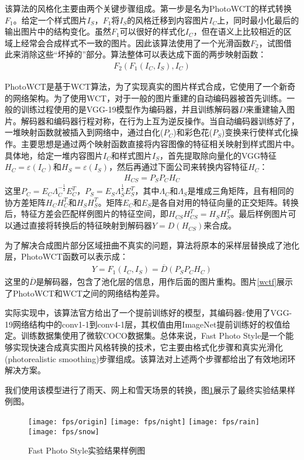 该算法的风格化主要由两个关键步骤组成。第一步是名为PhotoWCT的样式转换$F_1$。给定一个样式图片$I_S$，$F_1$将$I_S$的风格迁移到内容图片$I_C$上，同时最小化最后的输出图片中的结构变化。虽然$F_1$可以很好的样式化$I_C$，但在语义上比较相近的区域上经常会合成样式不一致的图片。因此该算法使用了一个光滑函数$F_2$，试图借此来消除这些“坏掉的”部分。算法整体可以表达成下面的两步映射函数：
\begin{align}
    F_2(F_1(I_C,I_S),I_C)
\end{align}

PhotoWCT是基于WCT\cite{wctp}算法，为了实现真实的图片样式合成，它使用了一个新奇的网络架构。为了使用WCT，对于一般的图片重建的自动编码器被首先训练。一般的训练过程使用的是VGG-19模型作为编码器\varepsilon，并且训练解码器$D$来重建输入图片。解码器和编码器行程对称，在行为上互为逆反操作。当自动编码器训练好了，一堆映射函数就被插入到网络中，通过白化($P_C$)和彩色花($P_S$)变换来行使样式化操作。主要思想是通过两个映射函数直接将内容图像的特征相关映射到样式图片中。具体地，给定一堆内容图片$I_C$和样式图片$I_S$，首先提取除向量化的VGG特征$H_C=\varepsilon(I_C)$和$H_S=\varepsilon(I_S)$，然后再通过下面公司来转换内容特征$H_C$：
\begin{align}
    H_{CS}=P_SP_CH_C
\end{align}
这里$P_C=E_C\Lambda_C^{-\frac{1}{2}}E_C^T$，$P_S=E_S\Lambda_S^{\frac{1}{2}}E_S^T$，其中$\Lambda_C$和$\Lambda_S$是堆成三角矩阵，且有相同的协方差矩阵$H_CH_C^T$和$H_SH_S^T$。矩阵$E_C$和$E_S$是各自对用的特征向量的正交矩阵。转换后，特征方差会匹配样例图片的特征空间，即$H_{CS}H_{CS}^T=H_SH_S^T$。最后样例图片可以通过直接将转换后的特征映射到解码器$Y=D(H_{CS})$来合成。

为了解决合成图片部分区域扭曲不真实的问题，算法将原本的采样层替换成了池化层，PhotoWCT函数可以表示成：
\begin{align}
    Y=F_1(I_C,I_S)=\overline{D}(P_SP_CH_C)
\end{align}
这里的$\overline{D}$是解码器，包含了池化层的信息，用作后面的图片重构。图片\ref{wctf}展示了PhotoWCT和WCT之间的网络结构差异。

实际实现中，该算法官方给出了一个提前训练好的模型，其编码器$\varepsilon$使用了VGG-19网络结构中的conv1-1到conv4-1层，其权值由用ImageNet提前训练好的权值给定。训练数据集使用了微软COCO数据集\cite{coco}。总体来说，Fast Photo Style是一个能够实现快速合成真实图片风格转换的技术，它主要由格式化步骤和真实光滑化(photorealistic smoothing)步骤组成。该算法对上述两个步骤都给出了有效地闭环解决方案。

我们使用该模型进行了雨天、网上和雪天场景的转换，图\ref{fps-result}展示了最终实验结果样例图。
\begin{figure}[h]
    \centering
    \texttt{[image: fps/origin]}
    \texttt{[image: fps/night]}
    \texttt{[image: fps/rain]}
    \texttt{[image: fps/snow]}
    \caption{Fast Photo Style实验结果样例图}
    \label{fps-result}
\end{figure}

